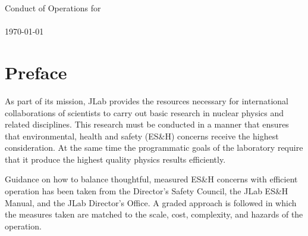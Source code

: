 \documentclass[11pt]{article}
\begin{document}
% 
%                       
%
%
%
%
%
%
%


\begin{center}
\Large 
Conduct of Operations for \HALL\ \\
\EXPTS \\ 
\today 
  
\end{center}
\normalsize

\tableofcontents


\newpage

\section{Preface}
\indent

As part of its mission, JLab provides the resources necessary for international
collaborations of scientists to carry out basic research in nuclear physics 
and related disciplines. This research must be conducted
in a manner that ensures that environmental, health and safety (ES\&H) 
concerns receive the highest consideration. At the same time the programmatic 
goals of the laboratory require that it produce the highest quality physics 
results efficiently.

Guidance on how to balance thoughtful, measured ES\&H concerns with efficient
operation has been taken from 
the Director's Safety Council, the JLab ES\&H Manual, and the
JLab Director's Office. A graded approach is followed in which the measures 
taken are matched to the scale, cost, complexity, and hazards of the operation.
\end{document}
